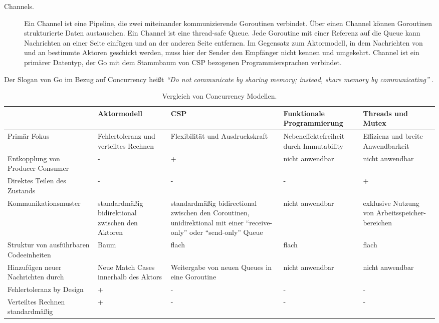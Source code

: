 \begin{description}
\begin{description}
		\item[Channels.] Ein Channel ist eine Pipeline, die zwei miteinander kommunizierende Goroutinen verbindet. Über einen Channel können Goroutinen strukturierte Daten austauschen. Ein Channel ist eine thread-safe Queue. Jede Goroutine mit einer Referenz auf die Queue kann Nachrichten an einer Seite einfügen und an der anderen Seite entfernen. Im Gegensatz zum Aktormodell, in dem Nachrichten von und an bestimmte Aktoren geschickt werden, muss hier der Sender den Empfänger nicht kennen und umgekehrt. Channel ist ein primärer Datentyp, der Go mit dem Stammbaum von CSP bezogenen Programmiersprachen verbindet.
	\end{description}

	Der Slogan von Go im Bezug auf Concurrency heißt \textit{“Do not communicate by sharing memory; instead, share memory by communicating”} \cite{Westrup14usingthe}.
	
\end{description}

\begin{table} \centering
	\begin{tabular}{|P{2.5cm}|P{2.5cm}|P{2.5cm}|P{2.5cm}|P{2.5cm}|} 
		\hline
		&  \textbf{Aktormodell} & \textbf{CSP} & \textbf{Funktionale Programmierung} & \textbf{Threads und Mutex}\\
		
		\hline
		Primär Fokus & Fehlertoleranz und verteiltes Rechnen & Flexibilität und Ausdruckskraft & Nebeneffektefreiheit durch Immutability & Effizienz und breite Anwendbarkeit\\
		
		\hline
		Entkopplung von Producer-Consumer & - & + & nicht anwendbar & nicht anwendbar\\

		\hline
		Direktes Teilen des Zustands & - & - & - & +\\
		
		\hline
		Kommunikationsmuster & standardmäßig bidirektional zwischen den Aktoren & standardmäßig bidirectional zwischen den Coroutinen, unidirektional mit einer “receive-only” oder “send-only” Queue & nicht anwendbar & exklusive Nutzung von Arbeitsspeicher-bereichen\\
		
		\hline
		Struktur von ausführbaren Codeeinheiten & Baum & flach & flach & flach\\
		
		\hline
		Hinzufügen neuer Nachrichten durch & Neue Match Cases innerhalb des Aktors & Weitergabe von neuen Queues in eine Goroutine & nicht anwendbar & nicht anwendbar\\

		\hline
		Fehlertoleranz by Design & + & - & - & -\\
		
		\hline
		Verteiltes Rechnen standardmäßig & + & - & - & -\\
		
		\hline
	\end{tabular}
	\caption{Vergleich von Concurrency Modellen.}
	\label{tab:vergleichConcurrencyModelle}
\end{table}

